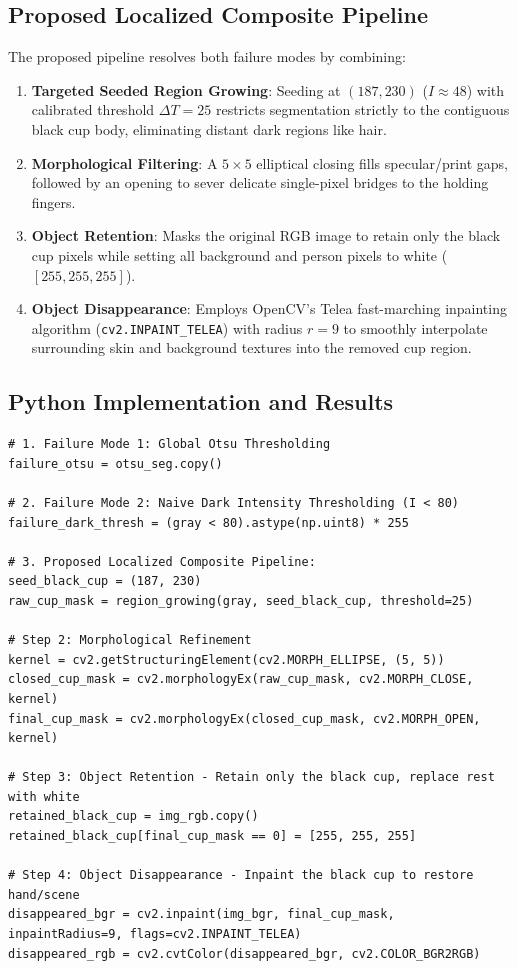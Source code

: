 \documentclass[12pt]{article}
\begin{document}
\subsection{Proposed Localized Composite Pipeline}
The proposed pipeline resolves both failure modes by combining:
\begin{enumerate}
    \item \textbf{Targeted Seeded Region Growing}: Seeding at $(187, 230)$ ($I \approx 48$) with calibrated threshold $\Delta T = 25$ restricts segmentation strictly to the contiguous black cup body, eliminating distant dark regions like hair.
    \item \textbf{Morphological Filtering}: A $5 \times 5$ elliptical closing fills specular/print gaps, followed by an opening to sever delicate single-pixel bridges to the holding fingers.
    \item \textbf{Object Retention}: Masks the original RGB image to retain only the black cup pixels while setting all background and person pixels to white ($[255, 255, 255]$).
    \item \textbf{Object Disappearance}: Employs OpenCV's Telea fast-marching inpainting algorithm (\texttt{cv2.INPAINT\_TELEA}) with radius $r=9$ to smoothly interpolate surrounding skin and background textures into the removed cup region.
\end{enumerate}

\subsection{Python Implementation and Results}
\begin{lstlisting}[style=code]
# 1. Failure Mode 1: Global Otsu Thresholding
failure_otsu = otsu_seg.copy()

# 2. Failure Mode 2: Naive Dark Intensity Thresholding (I < 80)
failure_dark_thresh = (gray < 80).astype(np.uint8) * 255

# 3. Proposed Localized Composite Pipeline:
seed_black_cup = (187, 230)
raw_cup_mask = region_growing(gray, seed_black_cup, threshold=25)

# Step 2: Morphological Refinement
kernel = cv2.getStructuringElement(cv2.MORPH_ELLIPSE, (5, 5))
closed_cup_mask = cv2.morphologyEx(raw_cup_mask, cv2.MORPH_CLOSE, kernel)
final_cup_mask = cv2.morphologyEx(closed_cup_mask, cv2.MORPH_OPEN, kernel)

# Step 3: Object Retention - Retain only the black cup, replace rest with white
retained_black_cup = img_rgb.copy()
retained_black_cup[final_cup_mask == 0] = [255, 255, 255]

# Step 4: Object Disappearance - Inpaint the black cup to restore hand/scene
disappeared_bgr = cv2.inpaint(img_bgr, final_cup_mask, inpaintRadius=9, flags=cv2.INPAINT_TELEA)
disappeared_rgb = cv2.cvtColor(disappeared_bgr, cv2.COLOR_BGR2RGB)
\end{lstlisting}
\end{document}
